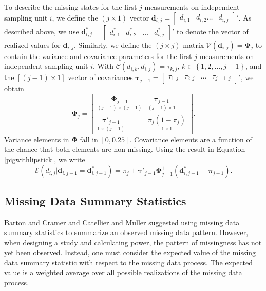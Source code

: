 \documentclass[11pt]{article}
\begin{document}
To describe the missing states for the first $j$ measurements on independent sampling unit $i$, we define the $\left(j\times 1\right)$ vector $\boldsymbol{d}_{i,j}=\begin{bmatrix}d_{i,1}&d_{i,2}\ldots&d_{i,j}\end{bmatrix}'$. As described above, we use $\boldsymbol{d}^{\ast}_{i,j}=\begin{bmatrix}d^{\ast}_{i,1}&d^{\ast}_{i,2}&\ldots&d^{\ast}_{i,j}\end{bmatrix}'$ to denote the vector of realized values for $\boldsymbol{d}_{i,j}$. Similarly, we define the $\left(j\times j\right)$ matrix $\boldsymbol{\mathcal{V}}\left(\boldsymbol{d}_{i,j}\right)=\boldsymbol{\Phi}_{j}$ to contain the variance and covariance parameters for the first $j$ measurements on independent sampling unit $i$. With $\mathcal{C}\left(d_{i,k},d_{i,j}\right)=\tau_{k,j}$, $k\in\left\{1,2,\ldots,j-1\right\}$, and the $\left[\left(j-1\right)\times 1\right]$ vector of covariances $\boldsymbol{\tau}_{j-1}=\begin{bmatrix}\tau_{1,j}&\tau_{2,j}&\ldots&\tau_{j-1,j}\end{bmatrix}'$, we obtain
\begin{equation}
\label{pigwithlipstick}
\boldsymbol{\Phi}_{j}=
\begin{bmatrix}
\underset{\left(j-1\right)\times\left(j-1\right)}{\boldsymbol{\Phi}_{j-1}}&
\underset{\left(j-1\right)\times 1}{\boldsymbol{\tau}_{j-1}}\\
\underset{1\times\left(j-1\right)}{\boldsymbol{\tau}'_{j-1}}&
\underset{1\times 1}{\pi_{j}\left(1-\pi_{j}\right)}
\end{bmatrix}.
\end{equation}
Variance elements in $\boldsymbol{\Phi}$ fall in $\left[0,0.25\right]$. Covariance elements are a function of the chance that both elements are non-missing. Using the result in Equation \ref{pigwithlipstick}, we write
\begin{equation}
\mathcal{E}\left(d_{i,j}|\boldsymbol{d}_{i,j-1}=\boldsymbol{d}^{\ast}_{i,j-1}\right)=\pi_{j}+\boldsymbol{\tau}'_{j-1}\boldsymbol{\Phi}_{j-1}^{+}\left(\boldsymbol{d}^{\ast}_{i,j-1}-\boldsymbol{\pi}_{j-1}\right).
\end{equation}

\subsection{Missing Data Summary Statistics}

Barton and Cramer \cite{barton_hypothesis_1989} and Catellier and Muller \cite{catellier_tests_2000} suggested using missing data summary statistics to summarize an observed missing data pattern. However, when designing a study and calculating power, the pattern of missingness has not yet been observed. Instead, one must consider the expected value of the missing data summary statistic with respect to the missing data process. The expected value is a weighted average over all possible realizations of the missing data process. 
\end{document}
